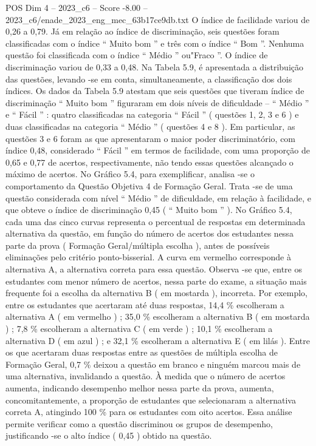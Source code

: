 \begin{textsample}{POS Dim 4 – 2023\_c6 – Score -8.00 – 2023\_c6/enade\_2023\_eng\_mec\_63b17ce9db.txt}
O índice de facilidade variou de 0,26 a 0,79.
Já em relação ao índice de discriminação, seis questões foram classificadas com o índice “ Muito bom ” e três com o índice “ Bom ”.
Nenhuma questão foi classificada com o índice “ Médio ” ou"Fraco ”.
O índice de discriminação variou de 0,33 a 0,48.
Na Tabela 5.9, é apresentada a distribuição das questões, levando -se em conta, simultaneamente, a classificação dos dois índices.
Os dados da Tabela 5.9 atestam que seis questões que tiveram índice de discriminação “ Muito bom ” figuraram em dois níveis de dificuldade – “ Médio ” e “ Fácil ” : quatro classificadas na categoria “ Fácil ” ( questões 1, 2, 3 e 6 ) e duas classificadas na categoria “ Médio ” ( questões 4 e 8 ).
Em particular, as questões 3 e 6 foram as que apresentaram o maior poder discriminatório, com índice 0,48, considerado “ Fácil ” em termos de facilidade, com uma proporção de 0,65 e 0,77 de acertos, respectivamente, não tendo essas questões alcançado o máximo de acertos.
No Gráfico 5.4, para exemplificar, analisa -se o comportamento da Questão Objetiva 4 de Formação Geral.
Trata -se de uma questão considerada com nível “ Médio ” de dificuldade, em relação à facilidade, e que obteve o índice de discriminação 0,45 ( “ Muito bom ” ).
No Gráfico 5.4, cada uma das cinco curvas representa o percentual de respostas em determinada alternativa da questão, em função do número de acertos dos estudantes nessa parte da prova ( Formação Geral/múltipla escolha ), antes de possíveis eliminações pelo critério ponto-bisserial.
A curva em vermelho corresponde à alternativa A, a alternativa correta para essa questão.
Observa -se que, entre os estudantes com menor número de acertos, nessa parte do exame, a situação mais frequente foi a escolha da alternativa B ( em mostarda ), incorreta.
Por exemplo, entre os estudantes que acertaram até duas respostas, 14,4 \% escolheram a alternativa A ( em vermelho ) ; 35,0 \% escolheram a alternativa B ( em mostarda ) ; 7,8 \% escolheram a alternativa C ( em verde ) ; 10,1 \% escolheram a alternativa D ( em azul ) ; e 32,1 \% escolheram a alternativa E ( em lilás ).
Entre os que acertaram duas respostas entre as questões de múltipla escolha de Formação Geral, 0,7 \% deixou a questão em branco e ninguém marcou mais de uma alternativa, invalidando a questão.
À medida que o número de acertos aumenta, indicando desempenho melhor nessa parte da prova, aumenta, concomitantemente, a proporção de estudantes que selecionaram a alternativa correta A, atingindo 100 \% para os estudantes com oito acertos.
Essa análise permite verificar como a questão discriminou os grupos de desempenho, justificando -se o alto índice ( 0,45 ) obtido na questão.

\end{textsample}
